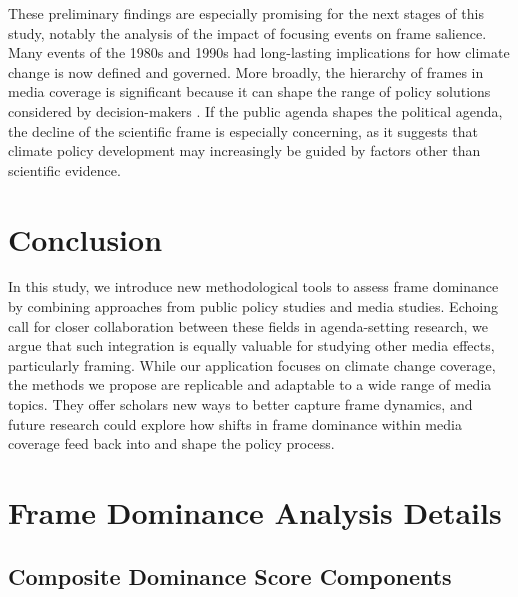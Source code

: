 \documentclass[12pt]{article}
\begin{document}
These preliminary findings are especially promising for the next stages of this study, notably the analysis of the impact of focusing events on frame salience. Many events of the 1980s and 1990s had long-lasting implications for how climate change is now defined and governed. More broadly, the hierarchy of frames in media coverage is significant because it can shape the range of policy solutions considered by decision-makers \autocite{mccombsAgendaSettingFunctionMass1972, gusfieldCulturePublicProblems1981}. If the public agenda shapes the political agenda, the decline of the scientific frame is especially concerning, as it suggests that climate policy development may increasingly be guided by factors other than scientific evidence.

\section{Conclusion}

In this study, we introduce new methodological tools to assess frame dominance by combining approaches from public policy studies and media studies. Echoing \textcite{wolfeFailureCommunicateAgenda2013a} call for closer collaboration between these fields in agenda-setting research, we argue that such integration is equally valuable for studying other media effects, particularly framing. While our application focuses on climate change coverage, the methods we propose are replicable and adaptable to a wide range of media topics. They offer scholars new ways to better capture frame dynamics, and future research could explore how shifts in frame dominance within media coverage feed back into and shape the policy process.

\newpage
\printbibliography[title={References}]

\appendix



\section{Frame Dominance Analysis Details}
\label{sec:dominance_scores}

\subsection{Composite Dominance Score Components}
\end{document}
